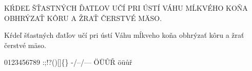 
KŔDEĽ ŠŤASTNÝCH ĎATĽOV UČÍ PRI ÚSTÍ VÁHU MĹKVÉHO KOŇA OBHRÝZAŤ KÔRU A ŽRAŤ ČERSTVÉ MÄSO.

Kŕdeľ šťastných ďatľov učí pri ústí Váhu mĺkveho koňa obhrýzať kôru a žrať čerstvé mäso.

0123456789 :;!?()[]\{\} -/--/--- ÖÜŮŘ öüůř 

